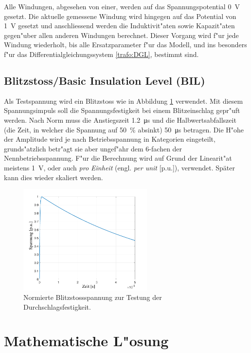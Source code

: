 \begin{refsection}
Alle Windungen, abgesehen von einer, werden auf das Spannungspotential \SI{0}{\volt} gesetzt. Die aktuelle gemessene Windung wird hingegen auf das Potential von \SI{1}{\volt} gesetzt und anschliessend werden die Induktivit"aten sowie Kapazit"aten gegen"uber allen anderen Windungen berechnet. Dieser Vorgang wird f"ur jede Windung wiederholt, bis alle Ersatzparameter f"ur das Modell, und ins besonders f"ur das Differentialgleichungssystem \ref{trafo:DGL}, bestimmt sind.

\subsection{Blitzstoss/\textbf{B}asic \textbf{I}nsulation \textbf{L}evel (BIL)}
Als Testspannung wird ein Blitzstoss wie in Abbildung \ref{trafo:BIL} verwendet. Mit diesem Spannungsimpuls soll die Spannungsfestigkeit bei einem Blitzeinschlag gepr"uft werden. Nach Norm muss die Anstiegszeit \SI{1.2}{\micro \second} und die Halbwertsabfallszeit (die Zeit, in welcher die Spannung auf \SI{50}{\percent} absinkt) \SI{50}{\micro \second} betragen. Die H"ohe der Amplitude wird je nach Betriebsspannung in Kategorien eingeteilt, grunds"atzlich betr"agt sie aber ungef"ahr dem 6-fachen der Nennbetriebsspannung. F"ur die Berechnung wird auf Grund der Linearit"at meistens \SI{1}{\volt}, oder auch \textit{pro Einheit} (engl. \textit{per unit} [p.u.]), verwendet. Später kann dies wieder skaliert werden.

\begin{figure}
	\centering
	\includegraphics[width=0.6\textwidth]{./Trafo/images/pulse.pdf}
	\caption{Normierte Blitzstossspannung zur Testung der Durchschlagsfestigkeit.}
	\label{trafo:BIL}
\end{figure}

\section{Mathematische L"osung}

\end{refsection}
